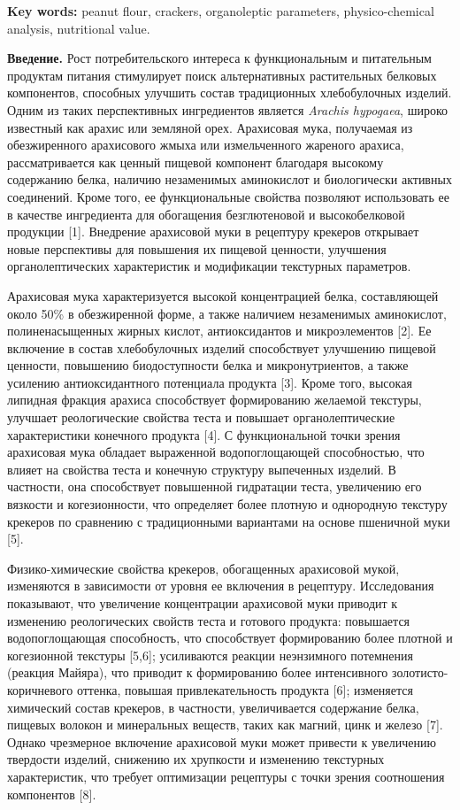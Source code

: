 {\bfseries Key words:} peanut flour, crackers, organoleptic parameters,
physico-chemical analysis, nutritional value.

\begin{multicols}{2}
{\bfseries Введение.} Рост потребительского интереса к функциональным и
питательным продуктам питания стимулирует поиск альтернативных
растительных белковых компонентов, способных улучшить состав
традиционных хлебобулочных изделий. Одним из таких перспективных
ингредиентов является \emph{Arachis hypogaea}, широко известный как
арахис или земляной орех. Арахисовая мука, получаемая из обезжиренного
арахисового жмыха или измельченного жареного арахиса, рассматривается
как ценный пищевой компонент благодаря высокому содержанию белка,
наличию незаменимых аминокислот и биологически активных соединений.
Кроме того, ее функциональные свойства позволяют использовать ее в
качестве ингредиента для обогащения безглютеновой и высокобелковой
продукции {[}1{]}. Внедрение арахисовой муки в рецептуру крекеров
открывает новые перспективы для повышения их пищевой ценности, улучшения
органолептических характеристик и модификации текстурных параметров.

Арахисовая мука характеризуется высокой концентрацией белка,
составляющей около 50\% в обезжиренной форме, а также наличием
незаменимых аминокислот, полиненасыщенных жирных кислот, антиоксидантов
и микроэлементов {[}2{]}. Ее включение в состав хлебобулочных изделий
способствует улучшению пищевой ценности, повышению биодоступности белка
и микронутриентов, а также усилению антиоксидантного потенциала продукта
{[}3{]}. Кроме того, высокая липидная фракция арахиса способствует
формированию желаемой текстуры, улучшает реологические свойства теста и
повышает органолептические характеристики конечного продукта {[}4{]}. С
функциональной точки зрения арахисовая мука обладает выраженной
водопоглощающей способностью, что влияет на свойства теста и конечную
структуру выпеченных изделий. В частности, она способствует повышенной
гидратации теста, увеличению его вязкости и когезионности, что
определяет более плотную и однородную текстуру крекеров по сравнению с
традиционными вариантами на основе пшеничной муки {[}5{]}.

Физико-химические свойства крекеров, обогащенных арахисовой мукой,
изменяются в зависимости от уровня ее включения в рецептуру.
Исследования показывают, что увеличение концентрации арахисовой муки
приводит к изменению реологических свойств теста и готового продукта:
повышается водопоглощающая способность, что способствует формированию
более плотной и когезионной текстуры {[}5,6{]}; усиливаются реакции
неэнзимного потемнения (реакция Майяра), что приводит к формированию
более интенсивного золотисто-коричневого оттенка, повышая
привлекательность продукта {[}6{]}; изменяется химический состав
крекеров, в частности, увеличивается содержание белка, пищевых волокон и
минеральных веществ, таких как магний, цинк и железо {[}7{]}. Однако
чрезмерное включение арахисовой муки может привести к увеличению
твердости изделий, снижению их хрупкости и изменению текстурных
характеристик, что требует оптимизации рецептуры с точки зрения
соотношения компонентов {[}8{]}.


\end{multicols}
